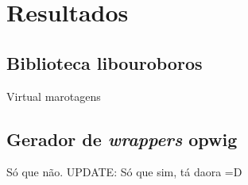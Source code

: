 \chapter{Resultados}
\label{sec:resultados}
\cite{xtr:00}

\section{Biblioteca \textbf{libouroboros}}
Virtual marotagens

\section{Gerador de \emph{wrappers} \textbf{opwig}}

Só que não. 
UPDATE: Só que sim, tá daora =D
